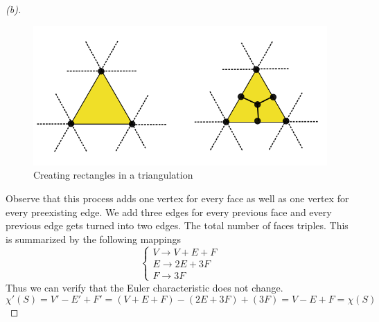 \documentclass[a4paper, 11pt]{article}
\begin{document}
		\begin{proof}[(b)]
			\begin{figure}[!hbt]
				\centering
				\includegraphics[width=0.5\columnwidth]{triangulation}
				\caption{Creating rectangles in a triangulation}
				\label{fig:triangulation} 
			\end{figure}
			
			Observe that this process adds one vertex for every face as well as one vertex for every preexisting edge. We add three edges for every previous face and every previous edge gets turned into two edges. The total number of faces triples. This is summarized by the following mappings 
				\begin{equation*}
					\begin{cases}
						V \to V+E+F \\ 
						E \to 2E + 3F \\ 
						F \to 3F 
					\end{cases}
				\end{equation*}
			\noindent Thus we can verify that the Euler characteristic does not change. 
				\begin{equation*}
					\chi'(S) = V'-E'+F' = (V+E+F)-(2E+3F)+(3F) = V-E+F = \chi(S)
				\end{equation*}
		\end{proof}
		
\end{document}
